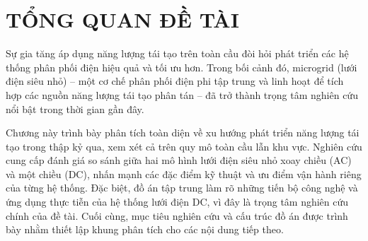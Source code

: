 \clearpage

\section{TỔNG QUAN ĐỀ TÀI}
Sự gia tăng áp dụng năng lượng tái tạo trên toàn cầu đòi hỏi phát triển các hệ thống phân phối điện hiệu quả và tối ưu hơn. Trong bối cảnh đó, microgrid (lưới điện siêu nhỏ) – một cơ chế phân phối điện phi tập trung và linh hoạt để tích hợp các nguồn năng lượng tái tạo phân tán – đã trở thành trọng tâm nghiên cứu nổi bật trong thời gian gần đây. \par
Chương này trình bày phân tích toàn diện về xu hướng phát triển năng lượng tái tạo trong thập kỷ qua, xem xét cả trên quy mô toàn cầu lẫn khu vực. Nghiên cứu cung cấp đánh giá so sánh giữa hai mô hình lưới điện siêu nhỏ xoay chiều (AC) và một chiều (DC), nhấn mạnh các đặc điểm kỹ thuật và ưu điểm vận hành riêng của từng hệ thống. Đặc biệt, đồ án tập trung làm rõ những tiến bộ công nghệ và ứng dụng thực tiễn của hệ thống lưới điện DC, vì đây là trọng tâm nghiên cứu chính của đề tài. Cuối cùng, mục tiêu nghiên cứu và cấu trúc đồ án được trình bày nhằm thiết lập khung phân tích cho các nội dung tiếp theo.\par

